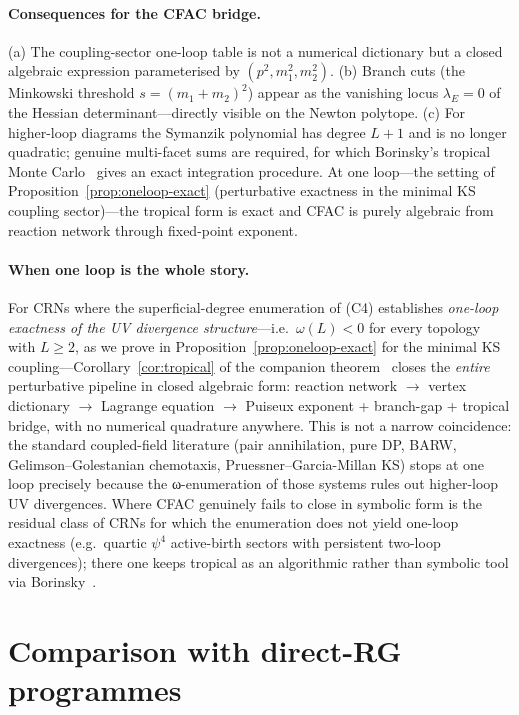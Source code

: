 \documentclass[11pt,a4paper]{article}
\theoremstyle{plain}
\begin{document}
\paragraph{Consequences for the CFAC bridge.}
(a) The coupling-sector one-loop table is not a numerical
dictionary but a closed algebraic expression parameterised by
$(p^2, m_1^2, m_2^2)$.
(b) Branch cuts (the Minkowski threshold $s = (m_1+m_2)^2$)
appear as the vanishing locus $\lambda_E = 0$ of the Hessian
determinant---directly visible on the Newton polytope.
(c) For higher-loop diagrams the Symanzik polynomial has degree
$L+1$ and is no longer quadratic; genuine multi-facet sums are
required, for which Borinsky's tropical Monte
Carlo~\cite{Borinsky2020,Borinsky2025} gives an exact integration
procedure.  At one loop---the setting of
Proposition~\ref{prop:oneloop-exact} (perturbative exactness in
the minimal KS coupling sector)---the tropical form is exact and
CFAC is purely algebraic from reaction network through fixed-point
exponent.

\paragraph{When one loop is the whole story.}
For CRNs where the superficial-degree enumeration of (C4)
establishes \emph{one-loop exactness of the UV divergence
structure}---i.e.\ $\omega(L) < 0$ for every topology with
$L \geq 2$, as we prove in Proposition~\ref{prop:oneloop-exact}
for the minimal KS coupling---Corollary~\ref{cor:tropical} of the
companion theorem~\citep{CFACtheorem} closes the \emph{entire}
perturbative pipeline in closed algebraic form: reaction network
$\to$ vertex dictionary $\to$ Lagrange equation $\to$ Puiseux
exponent + branch-gap + tropical bridge, with no numerical
quadrature anywhere.  This is not a narrow coincidence: the
standard coupled-field literature (pair annihilation, pure DP,
BARW, Gelimson--Golestanian chemotaxis, Pruessner--Garcia-Millan
KS) stops at one loop precisely because the ω-enumeration of
those systems rules out higher-loop UV divergences.  Where CFAC
genuinely fails to close in symbolic form is the residual class
of CRNs for which the enumeration does not yield one-loop
exactness (e.g.\ quartic $\psi^4$ active-birth sectors with
persistent two-loop divergences); there one keeps tropical as an
algorithmic rather than symbolic tool via
Borinsky~\cite{Borinsky2020,Borinsky2025}.

\section{Comparison with direct-RG programmes}
\label{sec:comparison}
\end{document}

